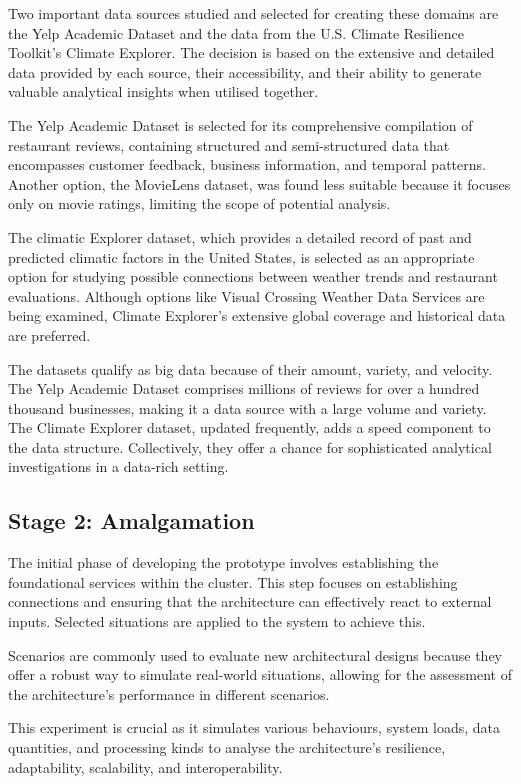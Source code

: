 \documentclass[preprint,12pt]{elsarticle}
\begin{document}
Two important data sources studied and selected for creating these domains are the Yelp Academic Dataset and the data from the U.S. Climate Resilience Toolkit's Climate Explorer. The decision is based on the extensive and detailed data provided by each source, their accessibility, and their ability to generate valuable analytical insights when utilised together.

The Yelp Academic Dataset is selected for its comprehensive compilation of restaurant reviews, containing structured and semi-structured data that encompasses customer feedback, business information, and temporal patterns. Another option, the MovieLens dataset, was found less suitable because it focuses only on movie ratings, limiting the scope of potential analysis.

The climatic Explorer dataset, which provides a detailed record of past and predicted climatic factors in the United States, is selected as an appropriate option for studying possible connections between weather trends and restaurant evaluations. Although options like Visual Crossing Weather Data Services are being examined, Climate Explorer's extensive global coverage and historical data are preferred.

The datasets qualify as big data because of their amount, variety, and velocity. The Yelp Academic Dataset comprises millions of reviews for over a hundred thousand businesses, making it a data source with a large volume and variety. The Climate Explorer dataset, updated frequently, adds a speed component to the data structure. Collectively, they offer a chance for sophisticated analytical investigations in a data-rich setting.

\subsection{Stage 2: Amalgamation}

The initial phase of developing the prototype involves establishing the foundational services within the cluster. This step focuses on establishing connections and ensuring that the architecture can effectively react to external inputs. Selected situations are applied to the system to achieve this. 

Scenarios are commonly used to evaluate new architectural designs because they offer a robust way to simulate real-world situations, allowing for the assessment of the architecture's performance in different scenarios. 

This experiment is crucial as it simulates various behaviours, system loads, data quantities, and processing kinds to analyse the architecture's resilience, adaptability, scalability, and interoperability. 
\end{document}
